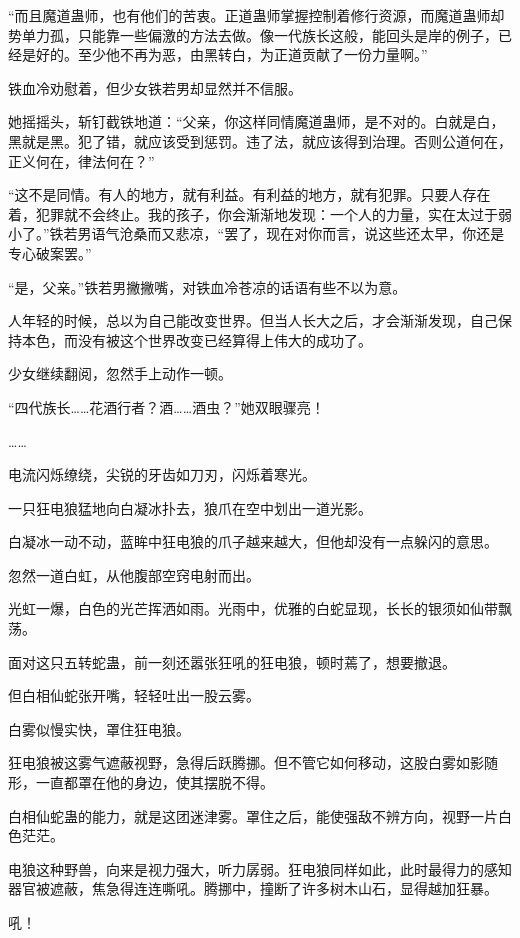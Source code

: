 \begin{this_body}
“而且魔道蛊师，也有他们的苦衷。正道蛊师掌握控制着修行资源，而魔道蛊师却势单力孤，只能靠一些偏激的方法去做。像一代族长这般，能回头是岸的例子，已经是好的。至少他不再为恶，由黑转白，为正道贡献了一份力量啊。”

铁血冷劝慰着，但少女铁若男却显然并不信服。

她摇摇头，斩钉截铁地道：“父亲，你这样同情魔道蛊师，是不对的。白就是白，黑就是黑。犯了错，就应该受到惩罚。违了法，就应该得到治理。否则公道何在，正义何在，律法何在？”

“这不是同情。有人的地方，就有利益。有利益的地方，就有犯罪。只要人存在着，犯罪就不会终止。我的孩子，你会渐渐地发现：一个人的力量，实在太过于弱小了。”铁若男语气沧桑而又悲凉，“罢了，现在对你而言，说这些还太早，你还是专心破案罢。”

“是，父亲。”铁若男撇撇嘴，对铁血冷苍凉的话语有些不以为意。

人年轻的时候，总以为自己能改变世界。但当人长大之后，才会渐渐发现，自己保持本色，而没有被这个世界改变已经算得上伟大的成功了。

少女继续翻阅，忽然手上动作一顿。

“四代族长……花酒行者？酒……酒虫？”她双眼骤亮！

……

电流闪烁缭绕，尖锐的牙齿如刀刃，闪烁着寒光。

一只狂电狼猛地向白凝冰扑去，狼爪在空中划出一道光影。

白凝冰一动不动，蓝眸中狂电狼的爪子越来越大，但他却没有一点躲闪的意思。

忽然一道白虹，从他腹部空窍电射而出。

光虹一爆，白色的光芒挥洒如雨。光雨中，优雅的白蛇显现，长长的银须如仙带飘荡。

面对这只五转蛇蛊，前一刻还嚣张狂吼的狂电狼，顿时蔫了，想要撤退。

但白相仙蛇张开嘴，轻轻吐出一股云雾。

白雾似慢实快，罩住狂电狼。

狂电狼被这雾气遮蔽视野，急得后跃腾挪。但不管它如何移动，这股白雾如影随形，一直都罩在他的身边，使其摆脱不得。

白相仙蛇蛊的能力，就是这团迷津雾。罩住之后，能使强敌不辨方向，视野一片白色茫茫。

电狼这种野兽，向来是视力强大，听力孱弱。狂电狼同样如此，此时最得力的感知器官被遮蔽，焦急得连连嘶吼。腾挪中，撞断了许多树木山石，显得越加狂暴。

吼！


\end{this_body}
